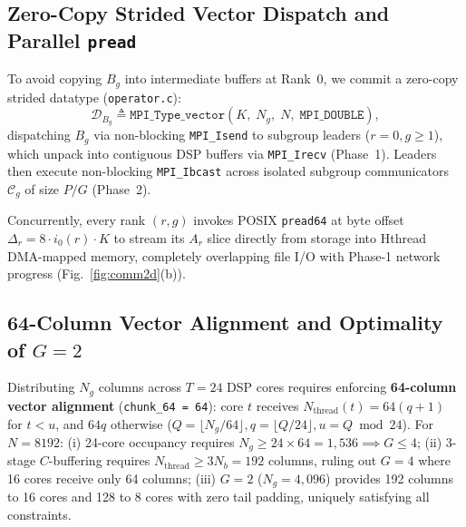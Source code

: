 \documentclass[conference]{IEEEtran}
\begin{document}
\subsection{Zero-Copy Strided Vector Dispatch and Parallel \texttt{pread}}
To avoid copying $B_g$ into intermediate buffers at Rank~0, we commit a zero-copy strided datatype (\texttt{operator.c}):
\begin{equation}
\mathcal{D}_{B_g} \triangleq \texttt{MPI\_Type\_vector}(K,\; N_g,\; N,\; \texttt{MPI\_DOUBLE}),
\label{eq:mpi_vector}
\end{equation}
dispatching $B_g$ via non-blocking \texttt{MPI\_Isend} to subgroup leaders ($r=0, g \ge 1$), which unpack into contiguous DSP buffers via \texttt{MPI\_Irecv} (Phase~1). Leaders then execute non-blocking \texttt{MPI\_Ibcast} across isolated subgroup communicators $\mathcal{C}_g$ of size $P/G$ (Phase~2).

Concurrently, every rank $(r, g)$ invokes POSIX \texttt{pread64} at byte offset $\Delta_r = 8 \cdot i_0(r) \cdot K$ to stream its $A_r$ slice directly from storage into Hthread DMA-mapped memory, completely overlapping file I/O with Phase-1 network progress (Fig.~\ref{fig:comm2d}(b)).

\subsection{64-Column Vector Alignment and Optimality of $G=2$}
Distributing $N_g$ columns across $T=24$ DSP cores requires enforcing \textbf{64-column vector alignment} (\texttt{chunk\_64 = 64}): core $t$ receives $N_{\mathrm{thread}}(t) = 64(q + 1)$ for $t < u$, and $64 q$ otherwise ($Q = \lfloor N_g/64 \rfloor, q = \lfloor Q/24 \rfloor, u = Q \bmod 24$). For $N=8192$: (i) 24-core occupancy requires $N_g \ge 24 \times 64 = 1{,}536 \implies G \le 4$; (ii) 3-stage $C$-buffering requires $N_{\mathrm{thread}} \ge 3 N_b = 192$ columns, ruling out $G=4$ where 16 cores receive only 64 columns; (iii) $G=2$ ($N_g=4{,}096$) provides 192 columns to 16 cores and 128 to 8 cores with zero tail padding, uniquely satisfying all constraints.
\end{document}
